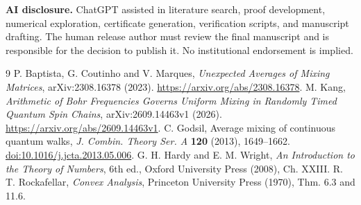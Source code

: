 \documentclass[11pt,a4paper]{article}
\begin{document}
\noindent\textbf{AI disclosure.} ChatGPT assisted in literature search, proof development, numerical exploration, certificate generation, verification scripts, and manuscript drafting. The human release author must review the final manuscript and is responsible for the decision to publish it. No institutional endorsement is implied.
\begin{thebibliography}{9}
 P. Baptista, G. Coutinho and V. Marques, \emph{Unexpected Averages of Mixing Matrices}, arXiv:2308.16378 (2023). \url{https://arxiv.org/abs/2308.16378}.
 M. Kang, \emph{Arithmetic of Bohr Frequencies Governs Uniform Mixing in Randomly Timed Quantum Spin Chains}, arXiv:2609.14463v1 (2026). \url{https://arxiv.org/abs/2609.14463v1}.
 C. Godsil, Average mixing of continuous quantum walks, \emph{J. Combin. Theory Ser. A} \textbf{120} (2013), 1649--1662. \href{https://doi.org/10.1016/j.jcta.2013.05.006}{doi:10.1016/j.jcta.2013.05.006}.
 G. H. Hardy and E. M. Wright, \emph{An Introduction to the Theory of Numbers}, 6th ed., Oxford University Press (2008), Ch. XXIII.
 R. T. Rockafellar, \emph{Convex Analysis}, Princeton University Press (1970), Thm. 6.3 and 11.6.
\end{thebibliography}
\end{document}
